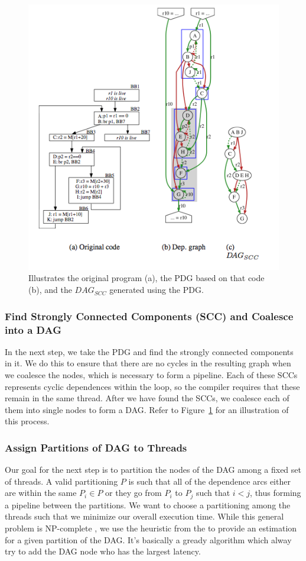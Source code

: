 \documentclass[11pt, letter]{article}
\begin{document}
\begin{figure}
\includegraphics[scale=0.75]{pdg}
\caption{Illustrates the original program (a), the PDG based on that code (b), and the $DAG_{SCC}$ generated using the PDG.}
\label{pdg}
\end{figure}

\subsubsection{Find Strongly Connected Components (SCC) and Coalesce into a DAG}
In the next step, we take the PDG and find the strongly connected components \cite{CLRS} in it.  We do this to ensure that there are no cycles in the resulting graph when we coalesce the nodes, which is necessary to form a pipeline.  Each of these SCCs represents cyclic dependences within the loop, so the compiler requires that these remain in the same thread.  After we have found the SCCs, we coalesce each of them into single nodes to form a DAG.  Refer to Figure~\ref{pdg} for an illustration of this process.

\subsubsection{Assign Partitions of DAG to Threads}
Our goal for the next step is to partition the nodes of the DAG among a fixed set of threads.  A valid partitioning $P$ is such that all of the dependence arcs either are within the same $P_i \in P$ or they go from $P_i$ to $P_j$ such that $i < j$, thus forming a pipeline between the partitions.  We want to choose a partitioning among the threads such that we minimize our overall execution time.  While this general problem is NP-complete \cite{DSWP-OR}, we use the heuristic from the \cite{DSWP-OR} to provide an estimation for a given partition of the DAG. It's basically a gready algorithm which alway try to add the DAG node who has the largest latency.
\end{document}
